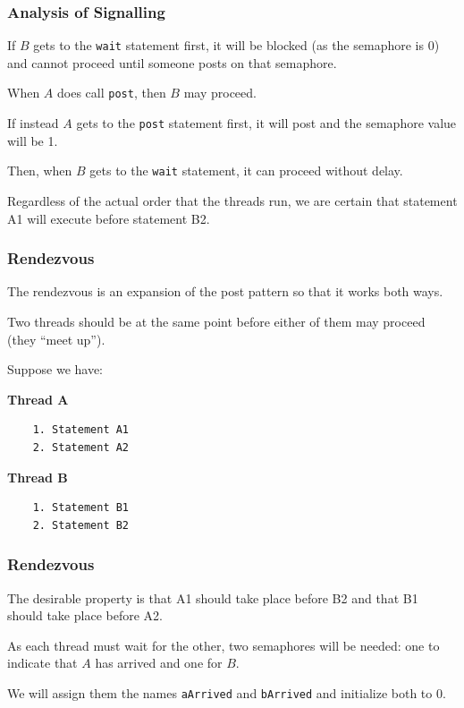 \begin{frame}
\frametitle{Analysis of Signalling}

If $B$ gets to the \texttt{wait} statement first, it will be blocked (as the semaphore is 0) and cannot proceed until someone posts on that semaphore. 

When $A$ does call \texttt{post}, then $B$ may proceed. 

If instead $A$ gets to the \texttt{post} statement first, it will post and the semaphore value will be 1. 

Then, when $B$ gets to the \texttt{wait} statement, it can proceed without delay.

Regardless of the actual order that the threads run, we are certain that statement A1 will execute before statement B2.

\end{frame}

\begin{frame}[fragile]
\frametitle{Rendezvous}

The rendezvous is an expansion of the post pattern so that it works both ways.

Two threads should be at the same point before either of them may proceed (they ``meet up'').

Suppose we have:

\begin{multicols}{2}
\textbf{Thread A}
  \begin{verbatim}
	1. Statement A1
	2. Statement A2
  \end{verbatim}
\columnbreak
\textbf{Thread B}
  \begin{verbatim}
	1. Statement B1
	2. Statement B2
  \end{verbatim}
\end{multicols}
\vspace{-2em}



\end{frame}

\begin{frame}
\frametitle{Rendezvous}

The desirable property is that A1 should take place before B2 and that B1 should take place before A2. 

As each thread must wait for the other, two semaphores will be needed: one to indicate that $A$ has arrived and one for $B$. 

We will assign them the names \texttt{aArrived} and \texttt{bArrived} and initialize both to 0. 

\end{frame}

